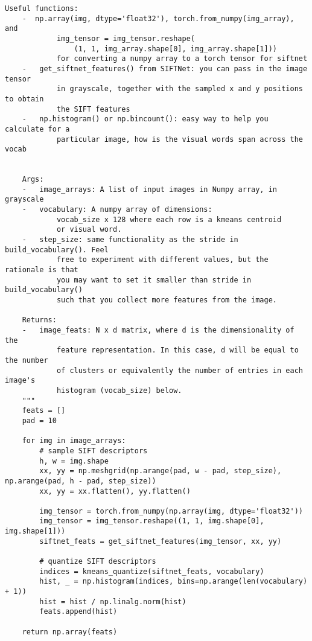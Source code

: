 \begin{lstlisting}[style=Python]
    Useful functions:
    -  np.array(img, dtype='float32'), torch.from_numpy(img_array), and
            img_tensor = img_tensor.reshape(
                (1, 1, img_array.shape[0], img_array.shape[1]))
            for converting a numpy array to a torch tensor for siftnet
    -   get_siftnet_features() from SIFTNet: you can pass in the image tensor
            in grayscale, together with the sampled x and y positions to obtain
            the SIFT features
    -   np.histogram() or np.bincount(): easy way to help you calculate for a
            particular image, how is the visual words span across the vocab


    Args:
    -   image_arrays: A list of input images in Numpy array, in grayscale
    -   vocabulary: A numpy array of dimensions:
            vocab_size x 128 where each row is a kmeans centroid
            or visual word.
    -   step_size: same functionality as the stride in build_vocabulary(). Feel
            free to experiment with different values, but the rationale is that
            you may want to set it smaller than stride in build_vocabulary()
            such that you collect more features from the image.

    Returns:
    -   image_feats: N x d matrix, where d is the dimensionality of the
            feature representation. In this case, d will be equal to the number
            of clusters or equivalently the number of entries in each image's
            histogram (vocab_size) below.
    """
    feats = []
    pad = 10
    
    for img in image_arrays:
        # sample SIFT descriptors
        h, w = img.shape
        xx, yy = np.meshgrid(np.arange(pad, w - pad, step_size), np.arange(pad, h - pad, step_size))
        xx, yy = xx.flatten(), yy.flatten()
        
        img_tensor = torch.from_numpy(np.array(img, dtype='float32'))
        img_tensor = img_tensor.reshape((1, 1, img.shape[0], img.shape[1]))
        siftnet_feats = get_siftnet_features(img_tensor, xx, yy)

        # quantize SIFT descriptors
        indices = kmeans_quantize(siftnet_feats, vocabulary)
        hist, _ = np.histogram(indices, bins=np.arange(len(vocabulary) + 1))
        hist = hist / np.linalg.norm(hist)
        feats.append(hist)
    
    return np.array(feats)
\end{lstlisting}